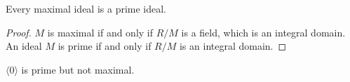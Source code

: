 \begin{theorem}
	Every maximal ideal is a prime ideal.
\end{theorem}

\begin{proof}
	$M$ is maximal if and only if $R/M$ is a field, which is an integral domain. An ideal $M$ is prime if and only if $R/M$ is an integral domain.
\end{proof}

\begin{remark}
	$\langle 0\rangle$ is prime but not maximal.
\end{remark}